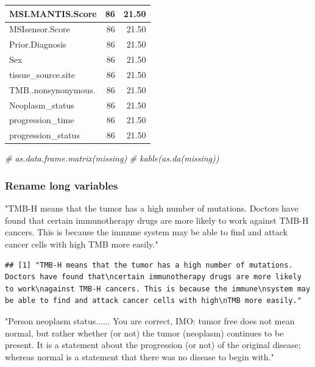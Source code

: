 \documentclass[
  11pt,
]{article}
\newenvironment{Shaded}{\begin{snugshade}}{\end{snugshade}}
\newcommand{\CommentTok}[1]{\textcolor[rgb]{0.56,0.35,0.01}{\textit{#1}}}
\newcommand{\StringTok}[1]{\textcolor[rgb]{0.31,0.60,0.02}{#1}}
\begin{document}
\begin{tabular}{l|r|r}
\hline
MSI.MANTIS.Score & 86 & 21.50\\
\hline
MSIsensor.Score & 86 & 21.50\\
\hline
Prior.Diagnosis & 86 & 21.50\\
\hline
Sex & 86 & 21.50\\
\hline
tissue\_source.site & 86 & 21.50\\
\hline
TMB..nonsynonymous. & 86 & 21.50\\
\hline
Neoplasm\_status & 86 & 21.50\\
\hline
progression\_time & 86 & 21.50\\
\hline
progression\_status & 86 & 21.50\\
\hline
\end{tabular}

\begin{Shaded}
\begin{Highlighting}[]
\CommentTok{\# as.data.frame.matrix(missing)}
\CommentTok{\# kable(as.da(missing))}
\end{Highlighting}
\end{Shaded}

\subsubsection{Rename long variables}

\begin{Shaded}
\begin{Highlighting}[]
\StringTok{"TMB{-}H means that the tumor has a high number of mutations. Doctors have found that}
\StringTok{certain immunotherapy drugs are more likely to work}
\StringTok{against TMB{-}H cancers. This is because the immune}
\StringTok{system may be able to find and attack cancer cells with high}
\StringTok{TMB more easily."}
\end{Highlighting}
\end{Shaded}

\begin{verbatim}
## [1] "TMB-H means that the tumor has a high number of mutations. Doctors have found that\ncertain immunotherapy drugs are more likely to work\nagainst TMB-H cancers. This is because the immune\nsystem may be able to find and attack cancer cells with high\nTMB more easily."
\end{verbatim}

\begin{Shaded}
\begin{Highlighting}[]
\StringTok{"Person neoplasm status...... You are correct, IMO:  tumor free does not mean normal, but rather whether (or not) the tumor (neoplasm) continues to be present.  It is a statement about the progression (or not) of the original disease; whereas normal is a statement that there was no disease to begin with."}
\end{Highlighting}
\end{Shaded}
\end{document}
